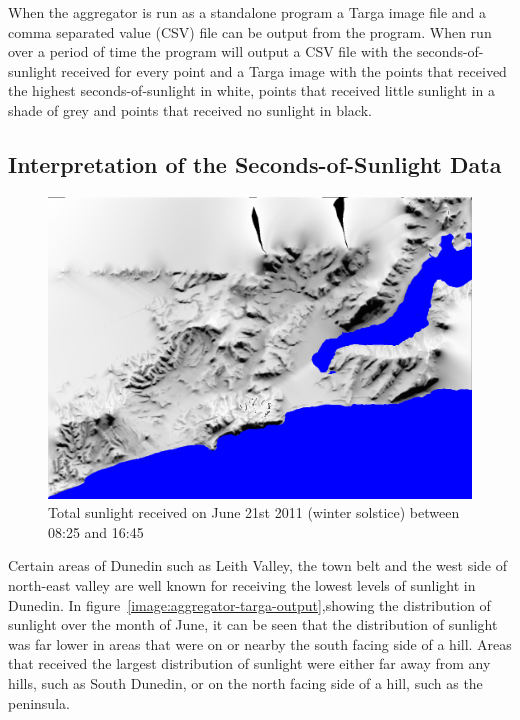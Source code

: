 \documentclass[12pt]{report}
\begin{document}
When the aggregator is run as a standalone program a Targa image file and a comma separated value (CSV) file can be output from the program. When run over a period of time the program will output a CSV file with the seconds-of-sunlight received for every point and a Targa image with the points that received the highest seconds-of-sunlight in white, points that received little sunlight in a shade of grey and points that received no sunlight in black.

\subsection{Interpretation of the Seconds-of-Sunlight Data}
\begin{figure}[h]
\centering
\includegraphics[scale=0.25]{wintersolstice.png}
\caption{Total sunlight received on June 21st 2011 (winter solstice) between 08:25 and 16:45}
\label{image:wintersolstice}
\end{figure}

Certain areas of Dunedin such as Leith Valley, the town belt and the west side of north-east valley are well known for receiving the lowest levels of sunlight in Dunedin. In figure~\ref{image:aggregator-targa-output},showing the distribution of sunlight over the month of June, it can be seen that the distribution of sunlight was far lower in areas that were on or nearby the south facing side of a hill. Areas that received the largest distribution of sunlight were either far away from any hills, such as South Dunedin, or on the north facing side of a hill, such as the peninsula.
\end{document}
